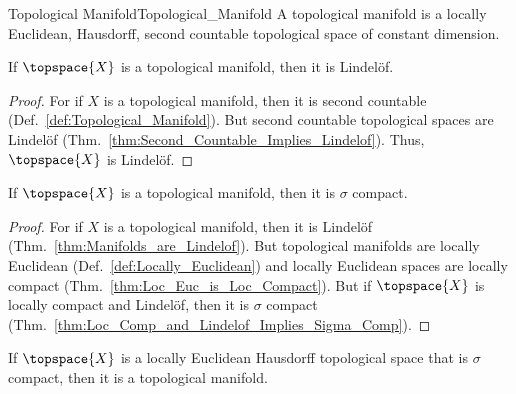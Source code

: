 \documentclass{article}                                                        %
\begin{document}
            \begin{fdefinition}{Topological Manifold}{Topological_Manifold}
                A topological manifold is a locally Euclidean, Hausdorff, second
                countable topological space of constant dimension.
            \end{fdefinition}
            \begin{theorem}
                \label{thm:Manifolds_are_Lindelof}%
                If $\topspace{X}$ is a topological manifold, then it is
                Lindel\"{o}f.
            \end{theorem}
            \begin{proof}
                For if $X$ is a topological manifold, then it is second countable
                (Def.~\ref{def:Topological_Manifold}). But second countable
                topological spaces are Lindel\"{o}f
                (Thm.~\ref{thm:Second_Countable_Implies_Lindelof}). Thus,
                $\topspace{X}$ is Lindel\"{o}f.
            \end{proof}
            \begin{theorem}
                \label{thm:Manifolds_are_Sigma_Compact}%
                If $\topspace{X}$ is a topological manifold, then it is $\sigma$
                compact.
            \end{theorem}
            \begin{proof}
                For if $X$ is a topological manifold, then it is Lindel\"{o}f
                (Thm.~\ref{thm:Manifolds_are_Lindelof}). But topological manifolds
                are locally Euclidean (Def.~\ref{def:Locally_Euclidean}) and locally
                Euclidean spaces are locally compact
                (Thm.~\ref{thm:Loc_Euc_is_Loc_Compact}). But if $\topspace{X}$ is
                locally compact and Lindel\"{o}f, then it is $\sigma$ compact
                (Thm.~\ref{thm:Loc_Comp_and_Lindelof_Implies_Sigma_Comp}).
            \end{proof}
            \begin{theorem}
                \label{thm:Loc_Euc_Haus_Sigma_Comp_is_Manifold}%
                If $\topspace{X}$ is a locally Euclidean Hausdorff topological
                space that is $\sigma$ compact, then it is a topological manifold.
            \end{theorem}
\end{document}
